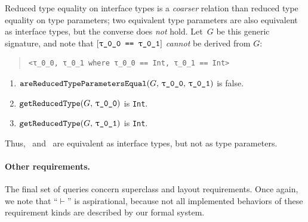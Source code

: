 \documentclass[../generics]{subfiles}
\begin{document}
\begin{example}
Reduced type equality on interface types is a \emph{coarser} relation than reduced type equality on type parameters; two equivalent type parameters are also equivalent as interface types, but the converse does \emph{not} hold. Let~$G$ be this generic signature, and note that $\SameReq{\rT}{\rU}$ \emph{cannot} be derived from $G$:
\begin{quote}
\begin{verbatim}
<τ_0_0, τ_0_1 where τ_0_0 == Int, τ_0_1 == Int>
\end{verbatim}
\end{quote}
\begin{enumerate}
\item $\Query{areReducedTypeParametersEqual}{G,\,\rT,\,\rU}$ is false.
\item $\Query{getReducedType}{G,\,\rT}$ is \texttt{Int}.
\item $\Query{getReducedType}{G,\,\rU}$ is \texttt{Int}.
\end{enumerate}
Thus, \rT\ and \rU\ are equivalent as interface types, but not as type parameters.
\end{example}

\paragraph{Other requirements.} The final set of queries concern superclass and layout requirements. Once again, we note that ``$\vdash$'' is aspirational, because not all implemented behaviors of these requirement kinds are described by our formal system.
\end{document}
